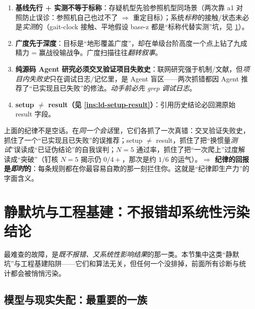 \begin{enumerate}
  \item \textbf{基线先行 + 实测不等于标称}：存疑机型先验参照机型同场景（两次靠 a1 对照防止误诊：参照机自己也过不了 $\Rightarrow$ 重定目标）；系统\emph{标称}的接触/状态未必是\emph{实测}的（gait-clock 接触、平地假设 base-z 都是“标称代替实测”坑，见 \cref{sec:ld-silent}）。
  \item \textbf{广度先于深度}：目标是“地形覆盖广度”，却在单级台阶高度一个点上钻了九成精力 = 赢战役输战争。广度扫描往往\emph{翻转叙事}。
  \item \textbf{纯源码 Agent 研究必须交叉验证项目失败史}：联网研究强于机制/文献，但\emph{项目内失败史}只在调试日志/记忆里，是 Agent 盲区——两次抓错都因 Agent 推荐了“已实现且已失败”的修法。\emph{动手前必先 grep 调试日志}。
  \item \textbf{setup $\ne$ result（见 \cref{ins:ld-setup-result}）}：引用历史结论必回溯原始 result 字段。
\end{enumerate}

\begin{insight}\label{ins:ld-discipline}
上面的纪律不是空话。在\emph{同一个会话}里，它们各抓了一次真错：交叉验证失败史，抓住了一个“已实现且已失败”的误推荐；setup $\ne$ result，抓住了把“换惯量\emph{测试}”误读成“已证伪结论”的自我误判；$N=5$ 通过率，抓住了把“一次爬上”过度解读成“突破”（钉核 $N=5$ 揭示仍 $0/4+$，那次是约 $1/6$ 的运气）。\textbf{$\Rightarrow$ 纪律的回报是\emph{即时}的}：每条规则都在你最容易自欺的那一刻拦住你。这就是“纪律即生产力”的字面含义。
\end{insight}

\section{静默坑与工程基建：不报错却系统性污染结论}
\label{sec:ld-silent}

最难查的故障，是\emph{既不报错、又系统性影响结果}的那一类。本节集中这类“静默坑”与工程基建陷阱——它们和算法无关，但任何一个没排掉，前面所有诊断与统计都会被悄悄污染。

\subsection{模型与现实失配：最重要的一族}
\label{subsec:ld-silent-mismatch}

